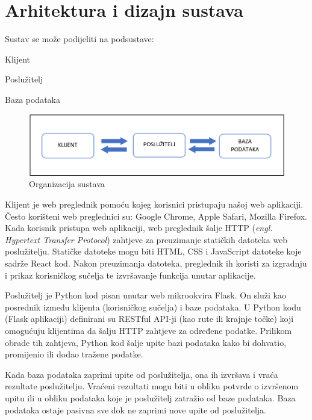 \chapter{Arhitektura i dizajn sustava}		
	
	Sustav se može podijeliti na podsustave:
		\begin{packed_item}
			
			\item  Klijent
			\item  Poslužitelj
			\item  Baza podataka
			
		\end{packed_item}
	
		\begin{figure}[H]
			\includegraphics[width=\textwidth]{slike/Organizacija_sustava.PNG} %
			\caption{Organizacija sustava}
			\label{fig:organizacija_sustava1} %
		\end{figure}
		
Klijent je web preglednik pomoću kojeg korisnici pristupaju našoj web aplikaciji. Često korišteni web preglednici su: Google Chrome, Apple Safari, Mozilla Firefox. Kada korisnik pristupa web aplikaciji, web preglednik šalje HTTP (\textit{engl. Hypertext Transfer Protocol}) zahtjeve za preuzimanje statičkih datoteka web poslužitelju. Statičke datoteke mogu biti HTML, CSS i JavaScript datoteke koje sadrže React kod. Nakon preuzimanja datoteka, preglednik ih koristi za izgradnju i prikaz korisničkog sučelja te izvršavanje funkcija unutar aplikacije. 

Poslužitelj je Python kod pisan unutar web mikrookvira Flask. On služi kao posrednik između  klijenta (korisničkog sučelja) i baze podataka. U Python kodu (Flask aplikaciji) definirani su RESTful API-ji (kao rute ili krajnje točke) koji omogućuju klijentima da šalju HTTP zahtjeve za određene podatke. Prilikom obrade tih zahtjeva, Python kod šalje upite bazi podataka kako bi dohvatio, promijenio ili dodao tražene podatke.

Kada baza podataka zaprimi upite od poslužitelja, ona ih izvršava i vraća rezultate poslužitelju. Vraćeni rezultati mogu biti u obliku potvrde o izvršenom upitu ili u obliku podataka koje je poslužitelj zatražio od baze podataka. Baza podataka ostaje pasivna sve dok ne zaprimi nove upite od poslužitelja.

